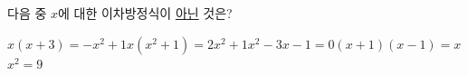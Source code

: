 다음 중 $x$에 대한 이차방정식이 \underline{아닌} 것은?
\begin{choicesii}{$x(x+3)=-x^2+1$}{$x(x^2+1)=2x^2+1$}{$x^2-3x-1=0$}{$(x+1)(x-1)=x$}{$x^2=9$}\end{choicesii}
